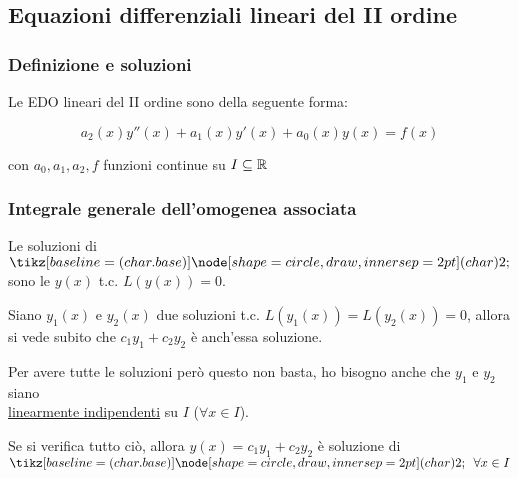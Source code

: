 
\subsection{Equazioni differenziali lineari del II ordine}

\subsubsection{Definizione e soluzioni}

Le EDO lineari del II ordine sono della seguente forma:

\[
    a_2(x)y''(x) + a_1(x) y'(x) + a_0(x) y(x) = f(x)
\]

con \(a_0,a_1,a_2,f\) funzioni continue su \(I \subseteq \mathbb{R} \)




\pagebreak
\subsubsection{Integrale generale dell'omogenea associata}

Le soluzioni di \(\circled{2}\) sono le \(y(x)\) t.c. \(L(y(x)) = 0\).

Siano \(y_1(x)\) e \(y_2(x)\) due soluzioni t.c. \(L(y_1(x)) = L(y_2(x)) = 0\),
allora si vede subito che \(c_1y_1 + c_2y_2\) è anch'essa soluzione.

Per avere tutte le soluzioni però questo non basta, ho bisogno anche che \(y_1\) e \(y_2\) siano \\
\underline{linearmente indipendenti} su \(I\) (\(\forall x \in I\)).

Se si verifica tutto ciò, allora \(y(x) = c_1y_1 + c_2y_2\) è soluzione di \(\circled{2}\ \ \forall x \in I\)

